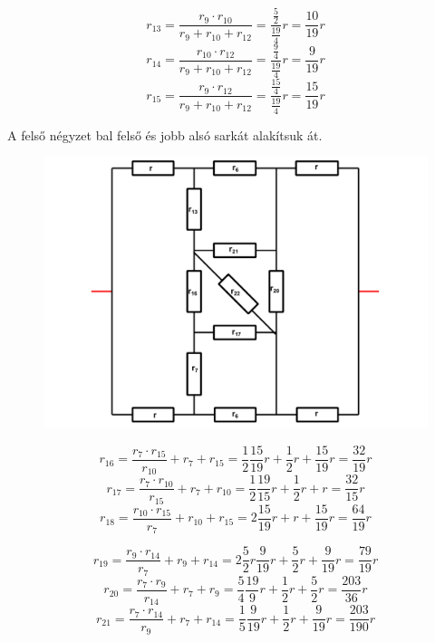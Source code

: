 \documentclass[11pt,a4paper,openany,leqno]{article}
\begin{document}
$$ r_{13} = \frac{r_9 \cdot r_{10}}{r_9 + r_{10} + r_{12}} = \frac{\frac{5}{2}}{\frac{19}{4}}r = \frac{10}{19} r $$
$$ r_{14} = \frac{r_{10} \cdot r_{12}}{r_9 + r_{10} + r_{12}} = \frac{\frac{9}{4}}{\frac{19}{4}}r = \frac{9}{19} r $$
$$ r_{15} = \frac{r_9 \cdot r_{12}}{r_9 + r_{10} + r_{12}} = \frac{\frac{15}{4}}{\frac{19}{4}}r = \frac{15}{19} r $$



\newpage
A felső négyzet bal felső és jobb alsó sarkát alakítsuk át.\\

\begin{figure}[h!]
\centering
  \includegraphics[width=150mm,scale=0.5]{grid_3_8.pdf}
  \caption{}
  \label{}
\end{figure}

$$ r_{16} = \frac{r_7 \cdot r_{15}}{r_{10}} + r_7 + r_{15} = \frac{1}{2} \frac{15}{19}r + \frac{1}{2}r + \frac{15}{19} r = \frac{32}{19} r $$
$$ r_{17} = \frac{r_7 \cdot r_{10}}{r_{15}} + r_7 + r_{10} = \frac{1}{2} \frac{19}{15}r + \frac{1}{2}r + r = \frac{32}{15} r $$
$$ r_{18} = \frac{r_{10} \cdot r_{15}}{r_{7}} + r_{10} + r_{15} = 2 \frac{15}{19}r + r + \frac{15}{19} r = \frac{64}{19} r $$

$$ r_{19} = \frac{r_9 \cdot r_{14}}{r_{7}} + r_9 + r_{14} = 2 \frac{5}{2}r \frac{9}{19}r + \frac{5}{2}r + \frac{9}{19} r  = \frac{79}{19} r $$
$$ r_{20} = \frac{r_7 \cdot r_9}{r_{14}} + r_7 + r_9 = \frac{5}{4} \frac{19}{9}r + \frac{1}{2}r + \frac{5}{2} r = \frac{203}{36} r $$
$$ r_{21} = \frac{r_7 \cdot r_{14}}{r_9} + r_7 + r_{14} = \frac{1}{5} \frac{9}{19}r + \frac{1}{2}r + \frac{9}{19} r = \frac{203}{190} r $$
\end{document}

